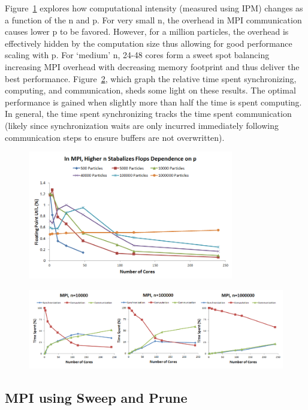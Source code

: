 \documentclass[11pt]{article} %
\begin{document}
Figure~\ref{mpi_mb_flops} explores how computational intensity (measured using IPM) changes as a function of the n and p. For very small n, the overhead in MPI communication causes lower p to be favored. However, for a million particles, the overhead is effectively hidden by the computation size thus allowing for good performance scaling with p. For `medium' n, 24-48 cores form a sweet spot balancing increasing MPI overhead with decreasing memory footprint and thus deliver the best performance. Figure~\ref{mpi_mb_rtime}, which graph the relative time spent synchronizing, computing, and communication, sheds some light on these results. The optimal performance is gained when slightly more than half the time is spent computing. In general, the time spent synchronizing tracks the time spent communication (likely since synchronization waits are only incurred immediately following communication steps to ensure buffers are not overwritten).

\begin{figure}[!h]
\centering
\includegraphics[width=0.8\textwidth]{figures/mpi_mb_flops.png}
\caption{}
\label{mpi_mb_flops}
\end{figure}

\begin{figure}[!h]
\centering
\includegraphics[width=1\textwidth]{figures/mpi_mb_rtime.png}
\caption{}
\label{mpi_mb_rtime}
\end{figure}

\subsection{MPI using Sweep and Prune}
\end{document}
